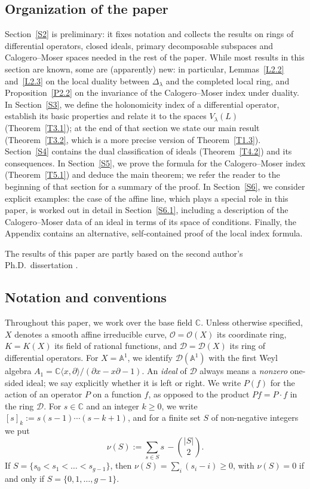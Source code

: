 \documentclass[11pt,reqno]{amsart}
\theoremstyle{plain}
\theoremstyle{definition}
\theoremstyle{remark}
\numberwithin{equation}{section}
\newcommand{\cD}{\mathcal{D}}
\newcommand{\cO}{\mathcal{O}}
\newcommand{\C}{\mathbb{C}}
\newcommand{\A}{\mathbb{A}}
\newcommand{\del}{\partial}
\newcommand{\Dl}{\Delta_\lambda}
\newcommand{\ff}[2]{[#1]_{#2}}          %
\newcommand{\lan}{\langle}
\newcommand{\ran}{\rangle}
\begin{document}
\subsection*{Organization of the paper}
Section~\ref{S2} is preliminary: it fixes notation and collects the results on rings of
differential operators, closed ideals, primary decomposable subspaces and Calogero--Moser spaces
needed in the rest of the paper. While most results in this section are known, some are
(apparently) new: in particular, Lemmas~\ref{L2.2} and~\ref{L2.3} on the local duality between
$\Dl$ and the completed local ring, and Proposition~\ref{P2.2} on the invariance of the
Calogero--Moser index under duality. In Section~\ref{S3}, we define the holonomicity index of a
differential operator, establish its basic properties and relate it to the spaces
$V_\lambda(L)$ (Theorem~\ref{T3.1}); at the end of that section we state our main result
(Theorem~\ref{T3.2}, which is a more precise version of Theorem~\ref{T1.3}). Section~\ref{S4}
contains the dual classification of ideals (Theorem~\ref{T4.2}) and its consequences. In
Section~\ref{S5}, we prove the formula for the Calogero--Moser index (Theorem~\ref{T5.1}) and
deduce the main theorem; we refer the reader to the beginning of that section for a summary of
the proof. In Section~\ref{S6}, we consider explicit examples: the case of the affine line, which
plays a special role in this paper, is worked out in detail in Section~\ref{S6.1}, including a
description of the Calogero--Moser data of an ideal in terms of its space of conditions. Finally,
the Appendix contains an alternative, self-contained proof of the local index formula.

The results of this paper are partly based on the second author's Ph.D.\ dissertation
\cite{GoldbergThesis}.

\subsection*{Notation and conventions}
Throughout this paper, we work over the base field $\C$. Unless otherwise specified, $X$ denotes
a smooth affine irreducible curve, $\cO = \cO(X)$ its coordinate ring, $K = K(X)$ its field of
rational functions, and $\cD = \cD(X)$ its ring of differential operators. For $X = \A^1$, we
identify $\cD(\A^1)$ with the first Weyl algebra $A_1 = \C\lan x, \del\ran/(\del x - x \del - 1)$.
An \emph{ideal} of $\cD$ always means a \emph{nonzero} one-sided ideal; we say explicitly whether
it is left or right. We write $P(f)$ for the action of an operator $P$ on a function $f$, as
opposed to the product $P f = P \cdot f$ in the ring $\cD$. For $s \in \C$ and an integer
$k \ge 0$, we write $\ff{s}{k} := s(s-1)\cdots(s-k+1)$, and for a finite set $S$ of non-negative
integers we put
\begin{equation}
\label{E110}
  \nu(S) := \sum_{s \in S} s \, - \binom{|S|}{2} .
\end{equation}
If $S = \{s_0 < s_1 < \ldots < s_{g-1}\}$, then $\nu(S) = \sum_{i} (s_i - i) \ge 0$, with
$\nu(S) = 0$ if and only if $S = \{0, 1, \ldots, g-1\}$.
\end{document}
